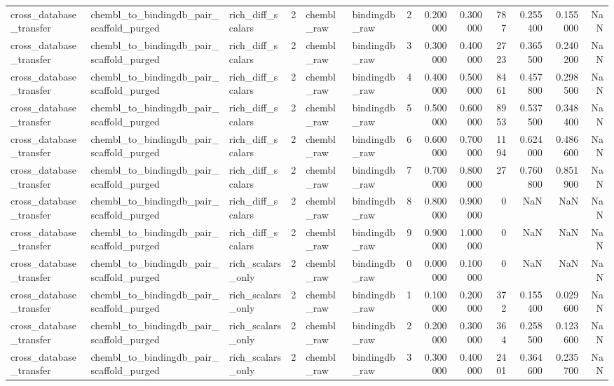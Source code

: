 \begin{longtable}{lllrllrrrrrrr}
cross\_database\_transfer & chembl\_to\_bindingdb\_pair\_scaffold\_purged & rich\_diff\_scalars & 2 & chembl\_raw & bindingdb\_raw & 2 & 0.200000 & 0.300000 & 787 & 0.255400 & 0.155000 & NaN \\
cross\_database\_transfer & chembl\_to\_bindingdb\_pair\_scaffold\_purged & rich\_diff\_scalars & 2 & chembl\_raw & bindingdb\_raw & 3 & 0.300000 & 0.400000 & 2723 & 0.365500 & 0.240200 & NaN \\
cross\_database\_transfer & chembl\_to\_bindingdb\_pair\_scaffold\_purged & rich\_diff\_scalars & 2 & chembl\_raw & bindingdb\_raw & 4 & 0.400000 & 0.500000 & 8461 & 0.457800 & 0.298500 & NaN \\
cross\_database\_transfer & chembl\_to\_bindingdb\_pair\_scaffold\_purged & rich\_diff\_scalars & 2 & chembl\_raw & bindingdb\_raw & 5 & 0.500000 & 0.600000 & 8953 & 0.537500 & 0.348400 & NaN \\
cross\_database\_transfer & chembl\_to\_bindingdb\_pair\_scaffold\_purged & rich\_diff\_scalars & 2 & chembl\_raw & bindingdb\_raw & 6 & 0.600000 & 0.700000 & 1194 & 0.624000 & 0.486600 & NaN \\
cross\_database\_transfer & chembl\_to\_bindingdb\_pair\_scaffold\_purged & rich\_diff\_scalars & 2 & chembl\_raw & bindingdb\_raw & 7 & 0.700000 & 0.800000 & 27 & 0.760800 & 0.851900 & NaN \\
cross\_database\_transfer & chembl\_to\_bindingdb\_pair\_scaffold\_purged & rich\_diff\_scalars & 2 & chembl\_raw & bindingdb\_raw & 8 & 0.800000 & 0.900000 & 0 & NaN & NaN & NaN \\
cross\_database\_transfer & chembl\_to\_bindingdb\_pair\_scaffold\_purged & rich\_diff\_scalars & 2 & chembl\_raw & bindingdb\_raw & 9 & 0.900000 & 1.000000 & 0 & NaN & NaN & NaN \\
cross\_database\_transfer & chembl\_to\_bindingdb\_pair\_scaffold\_purged & rich\_scalars\_only & 2 & chembl\_raw & bindingdb\_raw & 0 & 0.000000 & 0.100000 & 0 & NaN & NaN & NaN \\
cross\_database\_transfer & chembl\_to\_bindingdb\_pair\_scaffold\_purged & rich\_scalars\_only & 2 & chembl\_raw & bindingdb\_raw & 1 & 0.100000 & 0.200000 & 372 & 0.155400 & 0.029600 & NaN \\
cross\_database\_transfer & chembl\_to\_bindingdb\_pair\_scaffold\_purged & rich\_scalars\_only & 2 & chembl\_raw & bindingdb\_raw & 2 & 0.200000 & 0.300000 & 364 & 0.258500 & 0.123600 & NaN \\
cross\_database\_transfer & chembl\_to\_bindingdb\_pair\_scaffold\_purged & rich\_scalars\_only & 2 & chembl\_raw & bindingdb\_raw & 3 & 0.300000 & 0.400000 & 2401 & 0.364600 & 0.235700 & NaN \\

\end{longtable}
